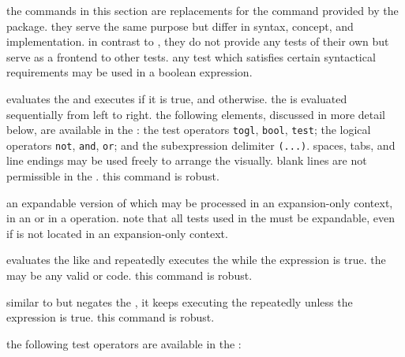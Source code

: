 the commands in this section are replacements for the  command provided by the  package. they serve the same purpose but differ in syntax, concept, and implementation. in contrast to , they do not provide any tests of their own but serve as a frontend to other tests. any test which satisfies certain syntactical requirements may be used in a boolean expression.

\begin{ltxsyntax}


evaluates the  and executes  if it is true, and  otherwise. the  is evaluated sequentially from left to right. the following elements, discussed in more detail below, are available in the : the test operators \texttt{togl}, \texttt{bool}, \texttt{test}; the logical operators \texttt{not}, \texttt{and}, \texttt{or}; and the subexpression delimiter \texttt{(...)}. spaces, tabs, and line endings may be used freely to arrange the  visually. blank lines are not permissible in the . this command is robust.


an expandable version of  which may be processed in an expansion-only context, \eg in an  or in a  operation. note that all tests used in the  must be expandable, even if  is not located in an expansion-only context.


evaluates the  like  and repeatedly executes the  while the expression is true. the  may be any valid \tex or \latex code. this command is robust.


similar to  but negates the , \ie it keeps executing the  repeatedly unless the expression is true. this command is robust.

\end{ltxsyntax}
%
the following test operators are available in the :

